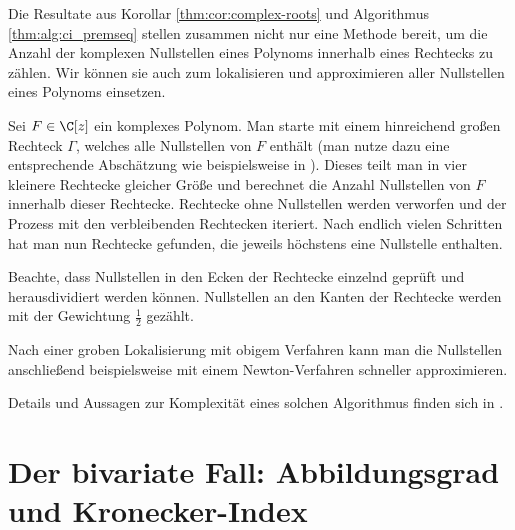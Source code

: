 \documentclass{mythesis}
\begin{document}
\begin{remark}
    Die Resultate aus Korollar \ref{thm:cor:complex-roots} und Algorithmus \ref{thm:alg:ci_premseq} stellen zusammen nicht nur eine Methode bereit, um die Anzahl der komplexen Nullstellen eines Polynoms innerhalb eines Rechtecks zu zählen.
    Wir können sie auch zum lokalisieren und approximieren aller Nullstellen eines Polynoms einsetzen.

    Sei $F \in \C[z]$ ein komplexes Polynom.
    Man starte mit einem hinreichend großen Rechteck $\Gamma$, welches alle Nullstellen von $F$ enthält (man nutze dazu eine entsprechende Abschätzung wie beispielsweise in \cite[Proposition 5.8]{eisermann2012fundamental}).
    Dieses teilt man in vier kleinere Rechtecke gleicher Größe und berechnet die Anzahl Nullstellen von $F$ innerhalb dieser Rechtecke.
    Rechtecke ohne Nullstellen werden verworfen und der Prozess mit den verbleibenden Rechtecken iteriert.
    Nach endlich vielen Schritten hat man nun Rechtecke gefunden, die jeweils höchstens eine Nullstelle enthalten.

    Beachte, dass Nullstellen in den Ecken der Rechtecke einzelnd geprüft und herausdividiert werden können.
    Nullstellen an den Kanten der Rechtecke werden mit der Gewichtung $\frac{1}{2}$ gezählt.

    Nach einer groben Lokalisierung mit obigem Verfahren kann man die Nullstellen anschließend beispielsweise mit einem Newton-Verfahren schneller approximieren.

    Details und Aussagen zur Komplexität eines solchen Algorithmus finden sich in \cite[§6.3~--~§6.10]{eisermann2012fundamental}.
\end{remark}











\chapter{Der bivariate Fall: Abbildungsgrad und Kronecker-Index} \label{sec:2}
\end{document}
